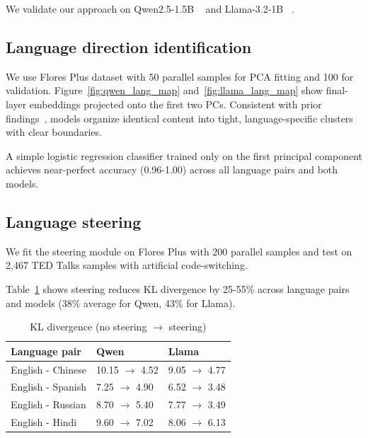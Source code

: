 \documentclass{article}
\begin{document}
We validate our approach on Qwen2.5-1.5B ~\cite{qwen2025qwen25technicalreport} and Llama-3.2-1B ~\cite{grattafiori2024llama3herdmodels}.

\subsection{Language direction identification}

We use Flores Plus \cite{nllb-24} dataset with 50 parallel samples for PCA fitting and 100 for validation. Figure~\ref{fig:qwen_lang_map} and~\ref{fig:llama_lang_map} show final-layer embeddings projected onto the first two PCs. Consistent with prior findings~\cite{conneau-etal-2020-emerging, wendler-etal-2024-llamas}, models organize identical content into tight, language-specific clusters with clear boundaries.

A simple logistic regression classifier trained only on the first principal component achieves near-perfect accuracy (0.96-1.00) across all language pairs and both models.

\subsection{Language steering}

We fit the steering module on Flores Plus with 200 parallel samples and test on 2,467 TED Talks samples with artificial code-switching.

Table~\ref{tab:kl} shows steering reduces KL divergence by 25-55\% across language pairs and models (38\% average for Qwen, 43\% for Llama).

\begin{table}[h]
  \centering
  \begin{tabular}{l l l}
    \hline
    Language pair & Qwen & Llama \\
    \hline
    English - Chinese & 10.15 $\rightarrow$ 4.52 & 9.05 $\rightarrow$ 4.77 \\
    English - Spanish & 7.25 $\rightarrow$ 4.90 & 6.52 $\rightarrow$ 3.48 \\
    English - Russian & 8.70 $\rightarrow$ 5.40 & 7.77 $\rightarrow$ 3.49 \\
    English - Hindi & 9.60 $\rightarrow$ 7.02 & 8.06 $\rightarrow$ 6.13 \\
    \hline
  \end{tabular}
  \caption{KL divergence (no steering $\rightarrow$ steering)}
  \label{tab:kl}
\end{table}
\end{document}
